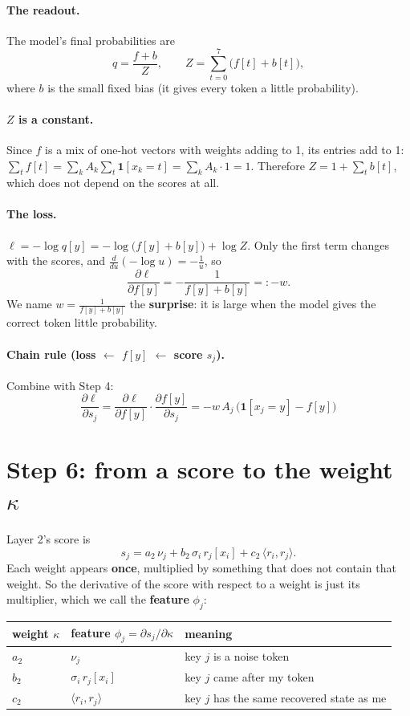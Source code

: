 \documentclass[11pt]{article}
\newcommand{\1}{\mathbf{1}}
\begin{document}
\paragraph{The readout.} The model's final probabilities are
\[
q=\frac{f+b}{Z},\qquad Z=\sum_{t=0}^{7}\big(f[t]+b[t]\big),
\]
where $b$ is the small fixed bias (it gives every token a little probability).

\paragraph{$Z$ is a constant.} Since $f$ is a mix of one-hot vectors with weights adding to 1, its entries
add to 1: $\sum_tf[t]=\sum_kA_k\sum_t\1[x_k=t]=\sum_kA_k\cdot1=1$. Therefore $Z=1+\sum_tb[t]$, which does
not depend on the scores at all.

\paragraph{The loss.} $\ell=-\log q[y]=-\log\big(f[y]+b[y]\big)+\log Z$. Only the first term changes with
the scores, and $\frac{d}{du}(-\log u)=-\frac1u$, so
\[
\frac{\partial\ell}{\partial f[y]}=-\frac{1}{f[y]+b[y]}=:-w .
\]
We name $w=\frac1{f[y]+b[y]}$ the \textbf{surprise}: it is large when the model gives the correct token
little probability.

\paragraph{Chain rule (loss $\leftarrow$ $f[y]$ $\leftarrow$ score $s_j$).} Combine with Step 4:
\[
\boxed{\ \frac{\partial\ell}{\partial s_j}=\frac{\partial\ell}{\partial f[y]}\cdot\frac{\partial f[y]}{\partial s_j}
=-w\,A_j\,\big(\1[x_j=y]-f[y]\big)\ }
\]

\section{Step 6: from a score to the weight $\kappa$}
Layer 2's score is
\[
s_j=a_2\,\nu_j+b_2\,\sigma_i\,r_j[x_i]+c_2\,\langle r_i,r_j\rangle .
\]
Each weight appears \textbf{once}, multiplied by something that does not contain that weight. So the
derivative of the score with respect to a weight is just its multiplier, which we call the
\textbf{feature} $\phi_j$:
\begin{center}
\begin{tabular}{lll}\toprule
weight $\kappa$ & feature $\phi_j=\partial s_j/\partial\kappa$ & meaning\\\midrule
$a_2$ & $\nu_j$ & key $j$ is a noise token\\
$b_2$ & $\sigma_i\,r_j[x_i]$ & key $j$ came after my token\\
$c_2$ & $\langle r_i,r_j\rangle$ & key $j$ has the same recovered state as me\\\bottomrule
\end{tabular}
\end{center}
\end{document}
